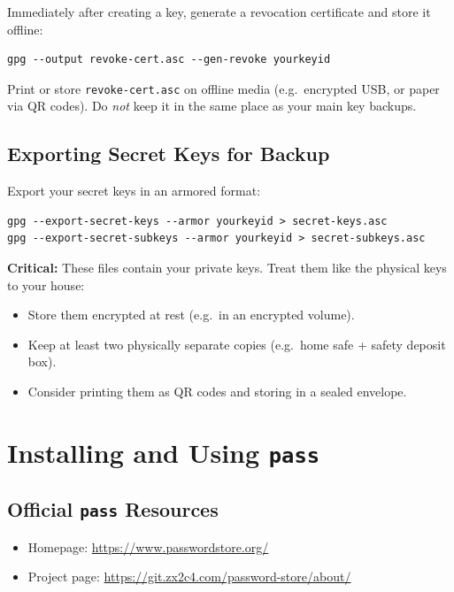 \documentclass[11pt,a4paper]{article}
\newcommand{\file}[1]{\texttt{#1}}
\begin{document}
Immediately after creating a key, generate a revocation certificate and store it offline:

\begin{verbatim}
gpg --output revoke-cert.asc --gen-revoke yourkeyid
\end{verbatim}

Print or store \file{revoke-cert.asc} on offline media (e.g.\ encrypted USB, or paper via QR codes). Do \emph{not} keep it in the same place as your main key backups.

\subsection{Exporting Secret Keys for Backup}

Export your secret keys in an armored format:

\begin{verbatim}
gpg --export-secret-keys --armor yourkeyid > secret-keys.asc
gpg --export-secret-subkeys --armor yourkeyid > secret-subkeys.asc
\end{verbatim}

\textbf{Critical:} These files contain your private keys. Treat them like the physical keys to your house:

\begin{itemize}[noitemsep]
  \item Store them encrypted at rest (e.g.\ in an encrypted volume).
  \item Keep at least two physically separate copies (e.g.\ home safe + safety deposit box).
  \item Consider printing them as QR codes and storing in a sealed envelope.
\end{itemize}

\section{Installing and Using \texttt{pass}}

\subsection{Official \texttt{pass} Resources}

\begin{itemize}[noitemsep]
  \item Homepage: \url{https://www.passwordstore.org/}
  \item Project page: \url{https://git.zx2c4.com/password-store/about/}
\end{itemize}
\end{document}
